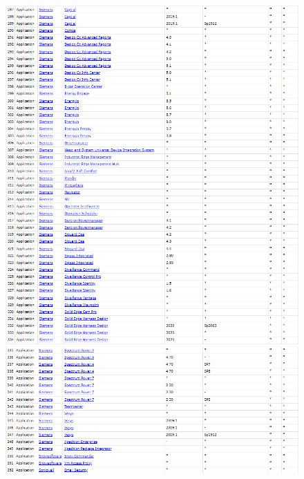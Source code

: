 \documentclass[11t]{article}
\begin{document}
\begin{figure}[H]
\begin{minipage}{0.49\textwidth}
    \end{minipage}
\end{figure}

\begin{figure}[H]
    \centering
    \begin{minipage}{0.49\textwidth}
        \centering
        \includegraphics[width=1\textwidth]{images/produtosAfetadosPergunta2_7.png}
    \end{minipage}
    \hfill
    \begin{minipage}{0.49\textwidth}
        \centering
        \includegraphics[width=1\textwidth]{images/produtosAfetadosPergunta2_8.png}
    \end{minipage}
\end{figure}
\end{document}
